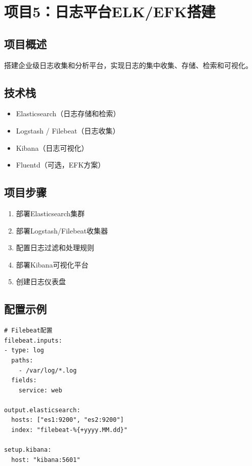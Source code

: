 \documentclass[12pt,UTF8]{ctexbook}
\begin{document}
\section{项目5：日志平台ELK/EFK搭建}
\label{sec:project-elk}

\subsection*{项目概述}

搭建企业级日志收集和分析平台，实现日志的集中收集、存储、检索和可视化。

\subsection*{技术栈}

\begin{itemize}
    \item Elasticsearch（日志存储和检索）
    \item Logstash / Filebeat（日志收集）
    \item Kibana（日志可视化）
    \item Fluentd（可选，EFK方案）
\end{itemize}

\subsection*{项目步骤}

\begin{enumerate}
    \item 部署Elasticsearch集群
    \item 部署Logstash/Filebeat收集器
    \item 配置日志过滤和处理规则
    \item 部署Kibana可视化平台
    \item 创建日志仪表盘
\end{enumerate}

\subsection*{配置示例}

\begin{lstlisting}
# Filebeat配置
filebeat.inputs:
- type: log
  paths:
    - /var/log/*.log
  fields:
    service: web

output.elasticsearch:
  hosts: ["es1:9200", "es2:9200"]
  index: "filebeat-%{+yyyy.MM.dd}"

setup.kibana:
  host: "kibana:5601"
\end{lstlisting}
\end{document}

